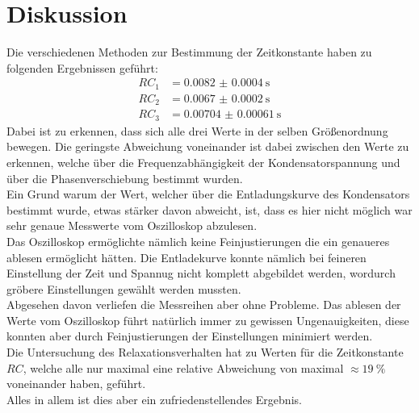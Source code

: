 \newpage
\section{Diskussion}

Die verschiedenen Methoden zur Bestimmung der Zeitkonstante haben zu folgenden Ergebnissen geführt:
\begin{align*}
    RC_1&= \SI{0.0082(4)}{\second} \\
    RC_2&=\SI{0.0067(2)}{\second}\\
    RC_3&=\SI{0.00704(61)}{\second}
\end{align*}
Dabei ist zu erkennen, dass sich alle drei Werte in der selben Größenordnung bewegen.
Die geringste Abweichung voneinander ist dabei zwischen den Werte zu erkennen, welche über die Frequenzabhängigkeit der Kondensatorspannung und über die Phasenverschiebung bestimmt wurden.\\
Ein Grund warum der Wert, welcher über die Entladungskurve des Kondensators bestimmt wurde, etwas stärker davon abweicht, ist, dass es hier nicht möglich war sehr genaue Messwerte vom Oszilloskop abzulesen.\\
Das Oszilloskop ermöglichte nämlich keine Feinjustierungen die ein genaueres ablesen ermöglicht hätten. 
Die Entladekurve konnte nämlich bei feineren Einstellung der Zeit und Spannug nicht komplett abgebildet werden, wordurch gröbere Einstellungen gewählt werden mussten.\\
Abgesehen davon verliefen die Messreihen aber ohne Probleme. Das ablesen der Werte vom Oszilloskop führt natürlich immer zu gewissen Ungenauigkeiten, diese konnten aber durch Feinjustierungen der Einstellungen minimiert werden.\\
Die Untersuchung des Relaxationsverhalten hat zu Werten für die Zeitkonstante $RC$, welche alle nur maximal eine relative Abweichung von maximal $\approx \SI{19}{\percent}$ voneinander haben, geführt.\\
Alles in allem ist dies aber ein zufriedenstellendes Ergebnis.